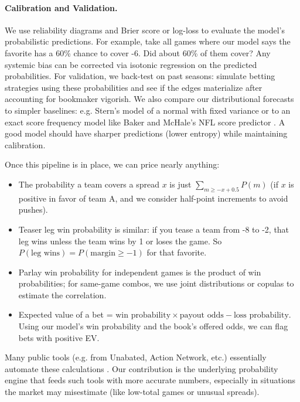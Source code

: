 \documentclass[12pt]{article}
\begin{document}
\paragraph{Calibration and Validation.} We use reliability diagrams and Brier score or log-loss to evaluate the model’s probabilistic predictions. For example, take all games where our model says the favorite has a 60\% chance to cover -6. Did about 60\% of them cover? Any systemic bias can be corrected via isotonic regression on the predicted probabilities. For validation, we back-test on past seasons: simulate betting strategies using these probabilities and see if the edges materialize after accounting for bookmaker vigorish. We also compare our distributional forecasts to simpler baselines: e.g. Stern’s model of a normal with fixed variance \cite{Stern1991} or to an exact score frequency model like Baker and McHale’s NFL score predictor \cite{Baker2013}. A good model should have sharper predictions (lower entropy) while maintaining calibration.

Once this pipeline is in place, we can price nearly anything:
\begin{itemize}
    \item The probability a team covers a spread $x$ is just $\sum_{m \ge -x+0.5}P(m)$ (if $x$ is positive in favor of team A, and we consider half-point increments to avoid pushes).
    \item Teaser leg win probability is similar: if you tease a team from -8 to -2, that leg wins unless the team wins by 1 or loses the game. So $P(\text{leg wins}) = P(\text{margin} \ge -1)$ for that favorite.
    \item Parlay win probability for independent games is the product of win probabilities; for same-game combos, we use joint distributions or copulas to estimate the correlation.
    \item Expected value of a bet = $\text{win probability} \times \text{payout odds} - \text{loss probability}$. Using our model’s win probability and the book’s offered odds, we can flag bets with positive EV.
\end{itemize}
Many public tools (e.g. from Unabated, Action Network, etc.) essentially automate these calculations \cite{Andrews2024}. Our contribution is the underlying probability engine that feeds such tools with more accurate numbers, especially in situations the market may misestimate (like low-total games or unusual spreads).
\end{document}
